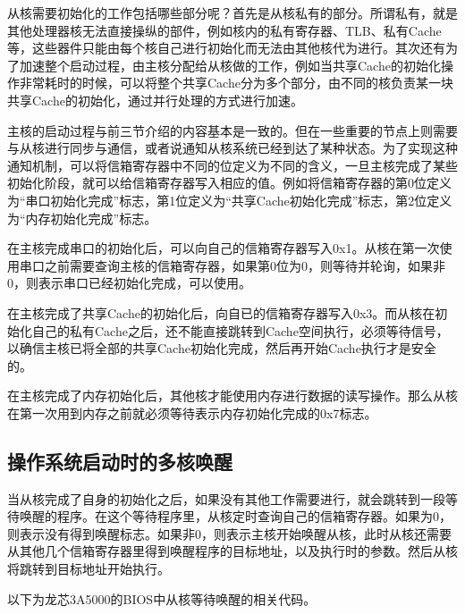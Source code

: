\documentclass[]{ctexbook}
\begin{document}
从核需要初始化的工作包括哪些部分呢？首先是从核私有的部分。所谓私有，就是其他处理器核无法直接操纵的部件，例如核内的私有寄存器、TLB、私有Cache等，这些器件只能由每个核自己进行初始化而无法由其他核代为进行。其次还有为了加速整个启动过程，由主核分配给从核做的工作，例如当共享Cache的初始化操作非常耗时的时候，可以将整个共享Cache分为多个部分，由不同的核负责某一块共享Cache的初始化，通过并行处理的方式进行加速。

主核的启动过程与前三节介绍的内容基本是一致的。但在一些重要的节点上则需要与从核进行同步与通信，或者说通知从核系统已经到达了某种状态。为了实现这种通知机制，可以将信箱寄存器中不同的位定义为不同的含义，一旦主核完成了某些初始化阶段，就可以给信箱寄存器写入相应的值。例如将信箱寄存器的第0位定义为``串口初始化完成''标志，第1位定义为``共享Cache初始化完成''标志，第2位定义为``内存初始化完成''标志。

在主核完成串口的初始化后，可以向自己的信箱寄存器写入0x1。从核在第一次使用串口之前需要查询主核的信箱寄存器，如果第0位为0，则等待并轮询，如果非0，则表示串口已经初始化完成，可以使用。

在主核完成了共享Cache的初始化后，向自已的信箱寄存器写入0x3。而从核在初始化自己的私有Cache之后，还不能直接跳转到Cache空间执行，必须等待信号，以确信主核已将全部的共享Cache初始化完成，然后再开始Cache执行才是安全的。

在主核完成了内存初始化后，其他核才能使用内存进行数据的读写操作。那么从核在第一次用到内存之前就必须等待表示内存初始化完成的0x7标志。

\hypertarget{ux64cdux4f5cux7cfbux7edfux542fux52a8ux65f6ux7684ux591aux6838ux5524ux9192}{%
\subsection{操作系统启动时的多核唤醒}\label{ux64cdux4f5cux7cfbux7edfux542fux52a8ux65f6ux7684ux591aux6838ux5524ux9192}}

当从核完成了自身的初始化之后，如果没有其他工作需要进行，就会跳转到一段等待唤醒的程序。在这个等待程序里，从核定时查询自己的信箱寄存器。如果为0，则表示没有得到唤醒标志。如果非0，则表示主核开始唤醒从核，此时从核还需要从其他几个信箱寄存器里得到唤醒程序的目标地址，以及执行时的参数。然后从核将跳转到目标地址开始执行。

以下为龙芯3A5000的BIOS中从核等待唤醒的相关代码。
\end{document}
